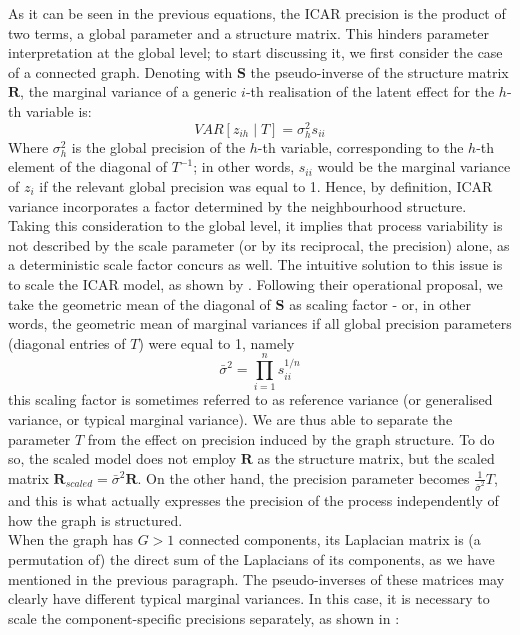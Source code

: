 \documentclass{article}
\begin{document}
As it can be seen in the previous equations, the ICAR precision is the product of two terms, a global parameter and a structure matrix. This hinders parameter interpretation at the global level; to start discussing it, we first consider the case of a connected graph. Denoting with $\mathbf{S}$ the pseudo-inverse of the structure matrix $\mathbf{R} $, the marginal variance of a generic $i$-th realisation of the latent effect for the $h$-th variable is: $$VAR[z_{ih} \mid T] = \sigma_{h}^2 s_{ii}$$
Where $\sigma_h^2$ is the global precision of the $h$-th variable, corresponding to the $h$-th element of the diagonal of $T^{-1}$; in other words, $s_{ii}$ would be the marginal variance of $z_i$ if the relevant global precision was equal to 1. Hence, by definition, ICAR variance incorporates a factor determined by the neighbourhood structure. Taking this consideration to the global level, it implies that process variability is not described by the scale parameter (or by its reciprocal, the precision) alone, as a deterministic scale factor concurs as well. The intuitive solution to this issue is to scale the ICAR model, as shown by \cite{Sorbye}. Following their operational proposal, we take the geometric mean of the diagonal of $\mathbf{S}$ as scaling factor - or, in other words, the geometric mean of marginal variances if all global precision parameters (diagonal entries of $T$) were equal to 1, namely
$$
\bar{\sigma}^{2} = \prod_{i=1}^{n} s_{ii}^{1/n}
$$
this scaling factor is sometimes referred to as reference variance (or generalised variance, 
or typical marginal variance). We are thus able to separate the parameter $T$ from the effect on precision induced by the graph structure. To do so, the scaled model does not employ $\mathbf{R}$ as the structure matrix, but the scaled matrix $\mathbf{R}_{scaled} = \bar{\sigma}^2 \mathbf{R} $. On the other hand, the precision parameter becomes $ \displaystyle{\frac{1}{\bar{\sigma}^2}} T$, and this is what actually expresses the precision of the process independently of how the graph is structured. \\
When the graph has $G >1$ connected components, its Laplacian matrix is (a permutation of) the direct sum of the Laplacians of its components, as we have mentioned in the previous paragraph. The pseudo-inverses of these matrices may clearly have different typical marginal variances. In this case, it is necessary to scale the component-specific precisions separately, as shown in \cite{Freni}:
\end{document}
